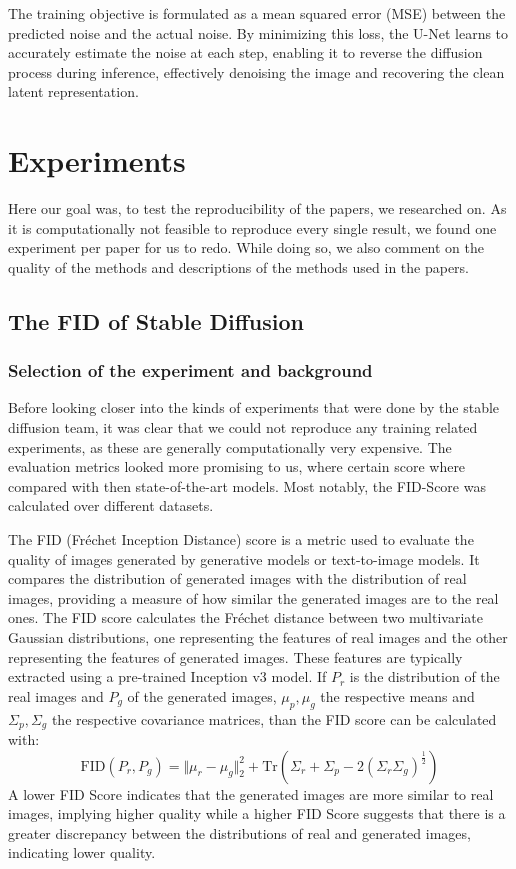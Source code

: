 \documentclass[11pt]{article}
\begin{document}
The training objective is formulated as a mean squared error (MSE) between the predicted noise and the actual noise. By minimizing this loss, the U-Net learns to accurately estimate the noise at each step, enabling it to reverse the diffusion process during inference, effectively denoising the image and recovering the clean latent representation.




\newpage
\section{Experiments}
Here our goal was, to test the reproducibility of the papers, we researched on. As it is computationally not feasible to reproduce every single result, we found one experiment per paper for us to redo. While doing so, we also comment on the quality of the methods and descriptions of the methods used in the papers. 

\subsection{The FID of Stable Diffusion}
\subsubsection{Selection of the experiment and background}
Before looking closer into the kinds of experiments that were done by the stable diffusion team, it was clear that we could not reproduce any training related experiments, as these are generally computationally very expensive. The evaluation metrics looked more promising to us, where certain score where compared with then state-of-the-art models. Most notably, the FID-Score was calculated over different datasets. 

The FID (Fréchet Inception Distance)\cite{heusel2018ganstrainedtimescaleupdate} score is a metric used to evaluate the quality of images generated by generative models or text-to-image models. It compares the distribution of generated images with the distribution of real images, providing a measure of how similar the generated images are to the real ones. The FID score calculates the Fréchet distance between two multivariate Gaussian distributions, one representing the features of real images and the other representing the features of generated images. These features are typically extracted using a pre-trained Inception v3 model. If $P_r$ is the distribution of the real images and $P_g$ of the generated images, $\mu_p, \mu_g$ the respective means and $\Sigma_p, \Sigma_g$ the respective covariance matrices, than the FID score can be calculated with:
$$\mathrm{FID}(P_r, P_g) = \Vert\mu_r - \mu_g\Vert_2^2 + \mathrm{Tr}\left(\Sigma_r + \Sigma_p - 2 (\Sigma_r\Sigma_g)^\frac{1}{2}\right)$$
A lower FID Score indicates that the generated images are more similar to real images, implying higher quality while a higher FID Score suggests that there is a greater discrepancy between the distributions of real and generated images, indicating lower quality.
\end{document}
